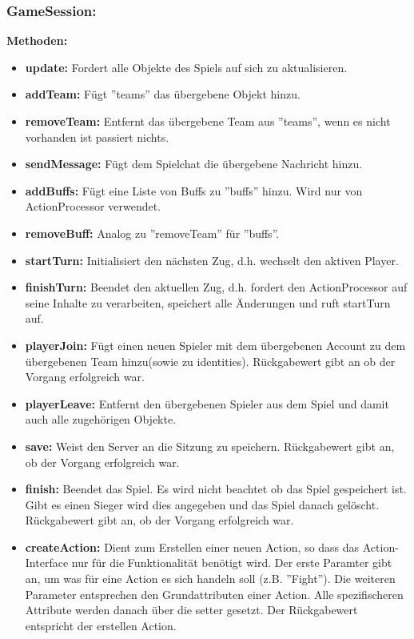 \documentclass[fontsize=12pt,paper=a4,twoside]{scrartcl}
\begin{document}
\subsubsection{GameSession:}
\textbf{Methoden:}
\begin{itemize}
	\item \textbf{update:} Fordert alle Objekte des Spiels auf sich zu aktualisieren.
	\item \textbf{addTeam:} Fügt ''teams'' das übergebene Objekt hinzu.
	\item \textbf{removeTeam:} Entfernt das übergebene Team aus ''teams'', wenn es nicht vorhanden ist passiert nichts.
	\item \textbf{sendMessage:} Fügt dem Spielchat die übergebene Nachricht hinzu.
	\item \textbf{addBuffs:} Fügt eine Liste von Buffs zu ''buffs'' hinzu. Wird nur von ActionProcessor verwendet.
	\item \textbf{removeBuff:} Analog zu ''removeTeam'' für ''buffs''.
	\item \textbf{startTurn:} Initialisiert den nächsten Zug, d.h. wechselt den aktiven Player.
	\item \textbf{finishTurn:} Beendet den aktuellen Zug, d.h. fordert den ActionProcessor auf seine Inhalte zu verarbeiten, speichert alle Änderungen und ruft startTurn auf.
	\item \textbf{playerJoin:} Fügt einen neuen Spieler mit dem übergebenen Account zu dem übergebenen Team hinzu(sowie zu identities). Rückgabewert gibt an ob der Vorgang erfolgreich war.
	\item \textbf{playerLeave:} Entfernt den übergebenen Spieler aus dem Spiel und damit auch alle zugehörigen Objekte.
	\item \textbf{save:} Weist den Server an die Sitzung zu speichern. Rückgabewert gibt an, ob der Vorgang erfolgreich war.
	\item \textbf{finish:} Beendet das Spiel. Es wird nicht beachtet ob das Spiel gespeichert ist. Gibt es einen Sieger wird dies angegeben und das Spiel danach gelöscht. Rückgabewert gibt an, ob der Vorgang erfolgreich war.
	\item \textbf{createAction:} Dient zum Erstellen einer neuen Action, so dass das Action-Interface nur für die Funktionalität benötigt wird. Der erste Paramter gibt an, um was für eine Action es sich handeln soll (z.B. ''Fight''). Die weiteren Parameter entsprechen den Grundattributen einer Action. Alle spezifischeren Attribute werden danach über die setter gesetzt. Der Rückgabewert entspricht der erstellen Action.
\end{itemize}
\end{document}
